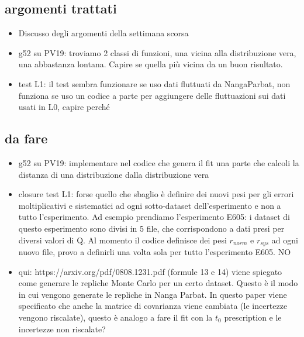 \documentclass{article}
\begin{document}
    \subsection{argomenti trattati}
    \begin{itemize}
        \item Discusso degli argomenti della settimana scorsa
        \item g52 su PV19: troviamo 2 classi di funzioni, una vicina alla distribuzione vera, una abbastanza lontana. Capire se quella più vicina da un buon risultato.
        \item test L1: il test sembra funzionare se uso dati fluttuati da NangaParbat, non funziona se uso un codice a parte per aggiungere delle fluttuazioni sui dati usati in L0, capire perché
    \end{itemize}
    \subsection{da fare}
    \begin{itemize}
        \item g52 su PV19: implementare nel codice che genera il fit una parte che calcoli la distanza di una distribuzione dalla distribuzione vera
        \item closure test L1: forse quello che sbaglio è definire dei nuovi pesi per gli errori moltiplicativi e sistematici ad ogni sotto-dataset dell'esperimento e non a tutto l'esperimento. Ad esempio prendiamo l'esperimento E605: i dataset di questo esperimento sono divisi in 5 file, che corrispondono a dati presi per diversi valori di Q. Al momento il codice definisce dei pesi $r_{norm}$ e $r_{sys}$ ad ogni nuovo file, provo a definirli una volta sola per tutto l'esperimento E605. NO
        \item qui: https://arxiv.org/pdf/0808.1231.pdf (formule 13 e 14) viene spiegato come generare le repliche Monte Carlo per un certo dataset. Questo è il modo in cui vengono generate le repliche in Nanga Parbat. In questo paper viene specificato che anche la matrice di covarianza viene cambiata (le incertezze vengono riscalate), questo è analogo a fare il fit con la $t_0$ prescription e le incertezze non riscalate? 
    \end{itemize}
\end{document}
